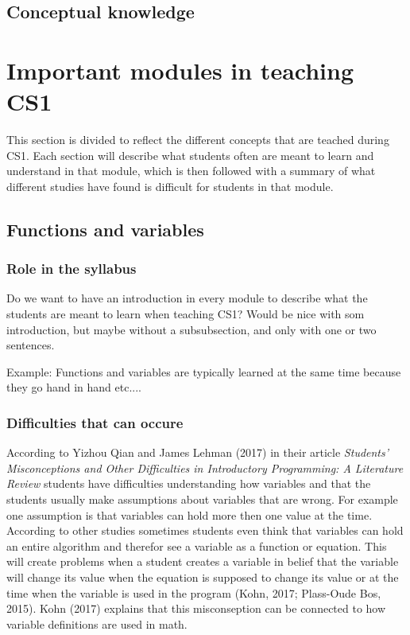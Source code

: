 \documentclass[twocolumn]{article}
\begin{document}
\subsection{Conceptual knowledge}

\section{Important modules in teaching CS1}

This section is divided to reflect the different concepts that are teached during CS1. Each section will describe what students often are meant to learn and understand in that module, which is then followed with a summary of what different studies have found is difficult for students in that module. 

\subsection{Functions and variables}

\subsubsection{Role in the syllabus}

Do we want to have an introduction in every module to describe what the students are meant to learn when teaching CS1? Would be nice with som introduction, but maybe without a subsubsection, and only with one or two sentences. 

Example: Functions and variables are typically learned at the same time because they go hand in hand etc....

\subsubsection{Difficulties that can occure}

According to Yizhou Qian and James Lehman (2017) in their article \emph{Students’ Misconceptions and Other Difficulties in Introductory Programming: A Literature Review} students have difficulties understanding how variables and that the students usually make assumptions about variables that are wrong. For example one assumption is that variables can hold more then one value at the time. According to other studies sometimes students even think that variables can hold an entire algorithm and therefor see a variable as a function or equation. This will create problems when a student creates a variable in belief that the variable will change its value when the equation is supposed to change its value or at the time when the variable is used in the program (Kohn, 2017; Plass-Oude Bos, 2015). Kohn (2017) explains that this misconseption can be connected to how variable definitions are used in math. 
\end{document}
